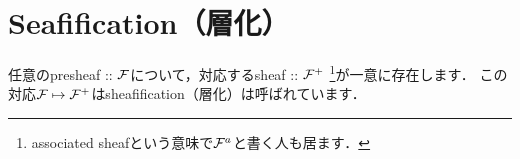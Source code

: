 \documentclass[]{jsarticle}
\begin{document}
\section{Seafification（層化）}
    任意のpresheaf :: $\mathcal{F}$について，対応するsheaf :: $\mathcal{F}^+$
    \footnote{ associated sheafという意味で$\mathcal{F}^a$と書く人も居ます． }が一意に存在します．
    この対応$\mathcal{F} \mapsto \mathcal{F}^+$はsheafification（層化）は呼ばれています．
    
\end{document}

